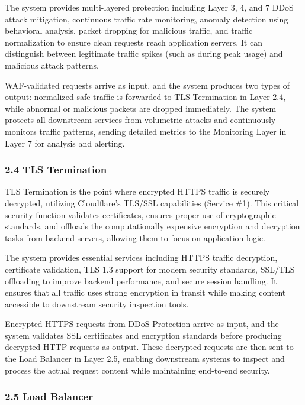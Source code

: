 \documentclass[12pt,a4paper]{report}
\begin{document}
The system provides multi-layered protection including Layer 3, 4, and 7 DDoS attack mitigation, continuous traffic rate monitoring, anomaly detection using behavioral analysis, packet dropping for malicious traffic, and traffic normalization to ensure clean requests reach application servers. It can distinguish between legitimate traffic spikes (such as during peak usage) and malicious attack patterns.

WAF-validated requests arrive as input, and the system produces two types of output: normalized safe traffic is forwarded to TLS Termination in Layer 2.4, while abnormal or malicious packets are dropped immediately. The system protects all downstream services from volumetric attacks and continuously monitors traffic patterns, sending detailed metrics to the Monitoring Layer in Layer 7 for analysis and alerting.

\subsubsection{2.4 TLS Termination}

TLS Termination is the point where encrypted HTTPS traffic is securely decrypted, utilizing Cloudflare's TLS/SSL capabilities (Service \#1). This critical security function validates certificates, ensures proper use of cryptographic standards, and offloads the computationally expensive encryption and decryption tasks from backend servers, allowing them to focus on application logic.

The system provides essential services including HTTPS traffic decryption, certificate validation, TLS 1.3 support for modern security standards, SSL/TLS offloading to improve backend performance, and secure session handling. It ensures that all traffic uses strong encryption in transit while making content accessible to downstream security inspection tools.

Encrypted HTTPS requests from DDoS Protection arrive as input, and the system validates SSL certificates and encryption standards before producing decrypted HTTP requests as output. These decrypted requests are then sent to the Load Balancer in Layer 2.5, enabling downstream systems to inspect and process the actual request content while maintaining end-to-end security.

\subsubsection{2.5 Load Balancer}
\end{document}

